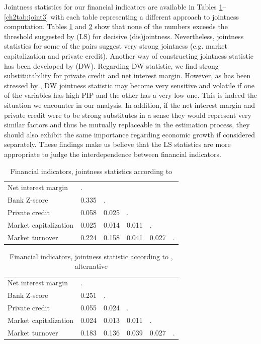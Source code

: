 \begin{subappendices}
Jointness statistics for our financial indicators are available in Tables \ref{ch2tab:joint1}--\ref{ch2tab:joint3} with each table representing a different approach to jointness computation. Tables \ref{ch2tab:joint1} and \ref{ch2tab:joint2} show that none of the numbers exceeds the threshold suggested by \citet{leysteel2007} (LS) for decisive (dis)jointness. Nevertheless, jointness statistics for some of the pairs suggest very strong jointness (e.g. market capitalization and private credit). Another way of constructing jointness statistic has been developed by \citet{doppelhoferweeks2009} (DW). Regarding DW statistic, we find strong substitutability for private credit and net interest margin. However, as has been stressed by \citet{leysteel2009b}, DW jointness statistic may become very sensitive and volatile if one of the variables has high \ac{PIP} and the other has a very low one. This is indeed the situation we encounter in our analysis. In addition, if the net interest margin and private credit were to be strong substitutes in a sense they would represent very similar factors and thus be mutually replaceable in the estimation process, they should also exhibit the same importance regarding economic growth if considered separately. These findings make us believe that the LS statistics are more appropriate to judge the interdependence between financial indicators.

\begin{table}[!htbp]
\caption{Financial indicators, jointness statistics according to \citet{leysteel2007}}
\label{ch2tab:joint1}
\small
\centering
\begin{tabular}{llllll}
   \toprule
  Net interest margin & . & &  &  &  \\ 
  Bank Z-score & 0.335 & . & & & \\ 
  Private credit & 0.058 & 0.025 & . & &  \\ 
  Market capitalization & 0.025 & 0.014 & 0.011 & . & \\ 
  Market turnover & 0.224 & 0.158 & 0.041 & 0.027 & . \\ 
   \bottomrule
\end{tabular}
\end{table}

\begin{table}[!htbp]
\caption{Financial indicators, jointness statistic according to \citet{leysteel2007}, alternative}
\label{ch2tab:joint2}
\small
\centering
\begin{tabular}{llllll}
   \toprule
  Net interest margin & . &  &  &  &  \\ 
  Bank Z-score & 0.251 & . &  &  &  \\ 
  Private credit & 0.055 & 0.024 & . &  &  \\ 
  Market capitalization & 0.024 & 0.013 & 0.011 & . &  \\ 
  Market turnover & 0.183 & 0.136 & 0.039 & 0.027 & . \\ 
   \bottomrule
\end{tabular}
\end{table}


\end{subappendices}
